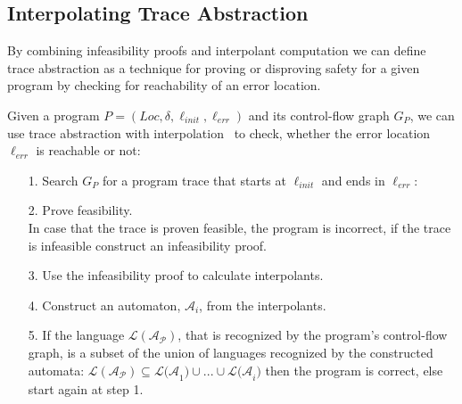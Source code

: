 \documentclass{article}
\newcommand\mycom[1]{}
\newcommand\mycom[1]{#1}
\newcommand{\dd}[1]{\mycom{\todo[color=orange!40,inline]{\small DD: #1}}}
\newcommand{\ts}[1]{\mycom{\todo[color=green!40,inline]{\small TS: #1}}}
\begin{document}
\subsection{Interpolating Trace Abstraction}
\dd{Why is this section called \emph{Interpolating} TA? Why not just TA?}
By combining infeasibility proofs and interpolant computation we can define trace abstraction as a technique for proving or disproving safety for a given program by checking for reachability of an error location.
\ts{What do you want to say with this phrase?}
Given a program $P = (Loc, \delta, \ell_{init}, \ell_{err})$ and its control-flow graph $G_P$, we can use trace abstraction with interpolation~\cite{10.1007/978-3-642-03237-0_7} to check, whether the error location $\ell_{err}$ is reachable or not:
\begin{itemize}
    \item[1.] Search $G_P$ for a program trace that starts at $\ell_{init}$ and ends in $\ell_{err}$:
    \begin{figure}[H]
        \centering
    \end{figure}

    \item[2.] Prove feasibility. \\ 
    In case that the trace is proven feasible, the program is incorrect, if the trace is infeasible construct an infeasibility proof.
    
    \item[3.] Use the infeasibility proof to calculate interpolants.
    \item[4.] Construct an automaton, $\mathcal{A}_i$, from the interpolants.
    \item[5.] If the language $\mathcal{L(A_P)}$, that is recognized by the program's control-flow graph, is a subset of the union of languages recognized by the constructed automata: $\mathcal{L(A_P)} \subseteq \mathcal{L(A}_1) \cup ... \cup \mathcal{L(A}_i)$ then the program is correct, else start again at step 1.
\end{itemize}
\end{document}
